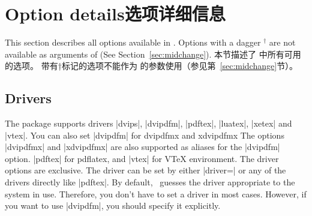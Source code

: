 \section{Option details\hfill 选项详细信息}
\begin{paracol}{2}
This section describes all options available in \Gm.
Options with a dagger $^\dagger$ are not available 
as arguments of  (See Section~\ref{sec:midchange}).
\switchcolumn
本节描述了 \Gm 中所有可用的选项。
带有†标记的选项不能作为  的参数使用（参见第~\ref{sec:midchange}节）。
\end{paracol}

% 
% 
% 
% 
%  
% 



\subsection{Drivers}\label{sec:drivers}

The package supports drivers |dvips|, |dvipdfm|, |pdftex|, |luatex|,
|xetex| and |vtex|. You can also set |dvipdfm| for \textsf{dvipdfmx} and
\textsf{xdvipdfmx} The options |dvipdfmx| and |xdvipdfmx| are also supported
as aliases for the |dvipdfm| option.
|pdftex| for \textsf{pdflatex}, and |vtex| for
V\TeX{} environment.
The driver options are exclusive. The driver can be set by either
|driver=| or any of the drivers directly like |pdftex|.
By default, \Gm\ guesses the driver appropriate to the system
in use. Therefore, you don't have to set a driver in most cases.
However, if you want to use |dvipdfm|, you should specify it explicitly.

